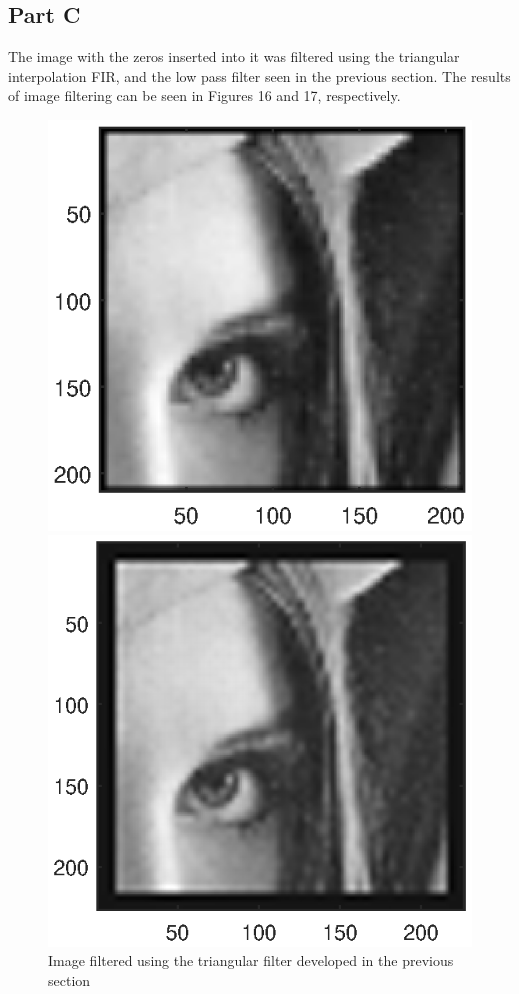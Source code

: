 \documentclass{article}
\begin{document}
\subsection{Part C}
The image with the zeros inserted into it was filtered using the triangular interpolation FIR, and the low pass filter seen in the previous section. The results of image filtering can be seen in Figures 16 and 17, respectively.
\begin{figure}[H]
	\begin{minipage}[t][][b]{0.48\linewidth}
		\centering
		\includegraphics[scale=0.86]{fig16}
		\caption{Image filtered using the triangular filter developed in the previous section}
	\end{minipage}
\hspace{0.5cm}
	\begin{minipage}[t][][b]{0.48\linewidth}
		\centering
		\includegraphics[scale=0.8]{fig17}

\end{minipage}
\end{figure}
\end{document}
